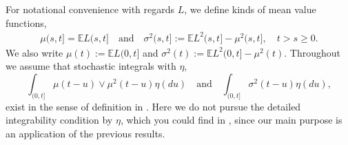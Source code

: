 \documentclass[11pt,leqno%
]{amsart}
\newcommand{\E }{{\mathbb E}}
\newcommand{\1}{{\mathbf 1}}
\begin{document}
 For notational convenience with regards $L$, 
 we define kinds of mean value functions, 
 \begin{align*}
  \mu(s,t]= \E L(s,t]\quad \text{and}\quad \sigma^2(s,t]:= \E L^2(s,t]-
  \mu^2(s,t],\quad t>s\ge 0. 
 \end{align*}
 We also write $\mu(t):=\E L(0,t]$ and $\sigma^2(t):=\E
 L^2(0,t]-\mu^2(t)$. Throughout we assume that stochastic integrals with
 $\eta$,
 \[
  \int_{(0,t]}\mu(t-u)\vee \mu^2(t-u)\eta(du)\quad \mathrm{and}\quad
  \int_{(0,t]}\sigma^2(t-u)\eta(du), 
 \]
 exist in the sense of definition in \cite[p.11]{rajput:rosinski:1989}. 
 Here we do not pursue the detailed integrability condition by $\eta$,
 which you could find in \cite[Theorem 2.7]{rajput:rosinski:1989}, since
 our main purpose is an application of the previous results. 
\end{document}
